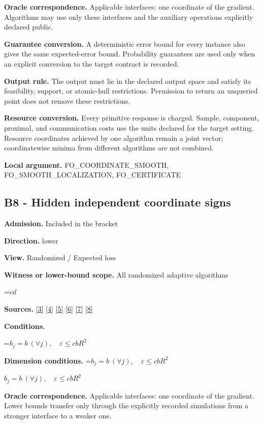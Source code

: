 \documentclass[10pt,a4paper]{article}
\newcommand{\AtlasMath}[1]{\par\begingroup\centering\setbox0=\hbox{$\displaystyle #1$}\ifdim\wd0>1.4\linewidth\typeout{ATLAS WIDE FORMULA: \the\wd0}\fi\ifdim\wd0>\linewidth\resizebox{\linewidth}{!}{\box0}\else\box0\fi\par\endgroup}
\newcommand{\AtlasInlineMath}[1]{\begingroup\setbox0=\hbox{$#1$}\ifdim\wd0>.4\linewidth\endgroup\AtlasMath{#1}\else\endgroup$#1$\fi}
\begin{document}
\textbf{Oracle correspondence.} Applicable interfaces: one coordinate of the gradient. Algorithms may use only these interfaces and the auxiliary operations explicitly declared public.

\textbf{Guarantee conversion.} A deterministic error bound for every instance also gives the same expected-error bound. Probability guarantees are used only when an explicit conversion to the target contract is recorded.

\textbf{Output rule.} The output must lie in the declared output space and satisfy its feasibility, support, or atomic-hull restrictions. Permission to return an unqueried point does not remove these restrictions.

\textbf{Resource conversion.} Every primitive response is charged. Sample, component, proximal, and communication costs use the units declared for the target setting. Resource coordinates achieved by one algorithm remain a joint vector; coordinatewise minima from different algorithms are not combined.

\textbf{Local argument.} FO\_\allowbreak{}COORDINATE\_\allowbreak{}SMOOTH, FO\_\allowbreak{}SMOOTH\_\allowbreak{}LOCALIZATION, FO\_\allowbreak{}CERTIFICATE

\subsection{B8 - Hidden independent coordinate signs}
\textbf{Admission.} Included in the bracket

\textbf{Direction.} lower

\textbf{View.} Randomized / Expected loss

\textbf{Witness or lower-bound scope.} All randomized adaptive algorithms

\AtlasMath{cd}
\textbf{Sources.} \href{https://arxiv.org/pdf/1405.4980}{[3]} \href{https://arxiv.org/pdf/2101.09740v2}{[4]} \href{https://arxiv.org/pdf/2609.33360v2}{[5]} \href{https://arxiv.org/pdf/2609.10874}{[6]} \href{https://www2.isye.gatech.edu/~nemirovs/MOR_AccuracyCertificates.pdf}{[7]} \href{https://arxiv.org/pdf/2609.20701}{[8]}

\textbf{Conditions.} 
\AtlasMath{b_j=b\ (\forall j),\quad\varepsilon\le cbR^2}


\textbf{Dimension conditions.} \AtlasInlineMath{b_j=b\ (\forall j),\quad\varepsilon\le cbR^2}

\textbf{Oracle correspondence.} Applicable interfaces: one coordinate of the gradient. Lower bounds transfer only through the explicitly recorded simulations from a stronger interface to a weaker one.
\end{document}
